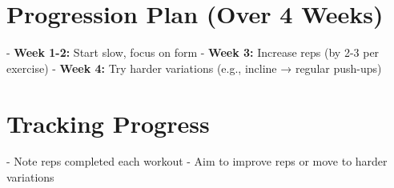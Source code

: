 \documentclass[a4paper,12pt]{article}
\begin{document}
\section{Progression Plan (Over 4 Weeks)}
- \textbf{Week 1-2:} Start slow, focus on form
- \textbf{Week 3:} Increase reps (by 2-3 per exercise)
- \textbf{Week 4:} Try harder variations (e.g., incline → regular push-ups)

\section{Tracking Progress}
- Note reps completed each workout
- Aim to improve reps or move to harder variations
\end{document}
